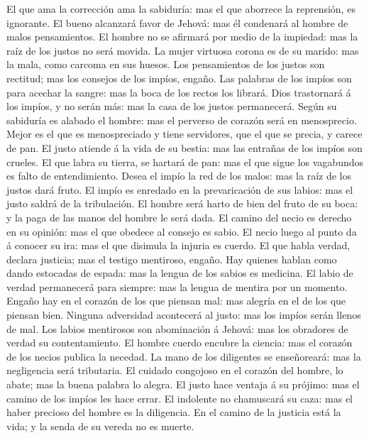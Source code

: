  El que ama la corrección ama la sabiduría: mas el que
aborrece la reprensión, es ignorante.  El bueno alcanzará
favor de Jehová: mas él condenará al hombre de malos pensamientos.
 El hombre no se afirmará por medio de la impiedad: mas la
raíz de los justos no será movida.  La mujer virtuosa corona
es de su marido: mas la mala, como carcoma en sus huesos. 
Los pensamientos de los justos son rectitud; mas los consejos de los
impíos, engaño.  Las palabras de los impíos son para acechar
la sangre: mas la boca de los rectos los librará.  Dios
trastornará á los impíos, y no serán más: mas la casa de los justos
permanecerá.  Según su sabiduría es alabado el hombre: mas
el perverso de corazón será en menosprecio.  Mejor es el que
es menospreciado y tiene servidores, que el que se precia, y carece de
pan.  El justo atiende á la vida de su bestia: mas las
entrañas de los impíos son crueles.  El que labra su
tierra, se hartará de pan: mas el que sigue los vagabundos es falto de
entendimiento.  Desea el impío la red de los malos: mas la
raíz de los justos dará fruto.  El impío es enredado en la
prevaricación de sus labios: mas el justo saldrá de la tribulación.
 El hombre será harto de bien del fruto de su boca: y la
paga de las manos del hombre le será dada.  El camino del
necio es derecho en su opinión: mas el que obedece al consejo es sabio.
 El necio luego al punto da á conocer su ira: mas el que
disimula la injuria es cuerdo.  El que habla verdad,
declara justicia; mas el testigo mentiroso, engaño.  Hay
quienes hablan como dando estocadas de espada: mas la lengua de los
sabios es medicina.  El labio de verdad permanecerá para
siempre: mas la lengua de mentira por un momento.  Engaño
hay en el corazón de los que piensan mal: mas alegría en el de los que
piensan bien.  Ninguna adversidad acontecerá al justo: mas
los impíos serán llenos de mal.  Los labios mentirosos son
abominación á Jehová: mas los obradores de verdad su contentamiento.
 El hombre cuerdo encubre la ciencia: mas el corazón de los
necios publica la necedad.  La mano de los diligentes se
enseñoreará: mas la negligencia será tributaria.  El
cuidado congojoso en el corazón del hombre, lo abate; mas la buena
palabra lo alegra.  El justo hace ventaja á su prójimo: mas
el camino de los impíos les hace errar.  El indolente no
chamuscará su caza: mas el haber precioso del hombre es la diligencia.
 En el camino de la justicia está la vida; y la senda de su
vereda no es muerte.

